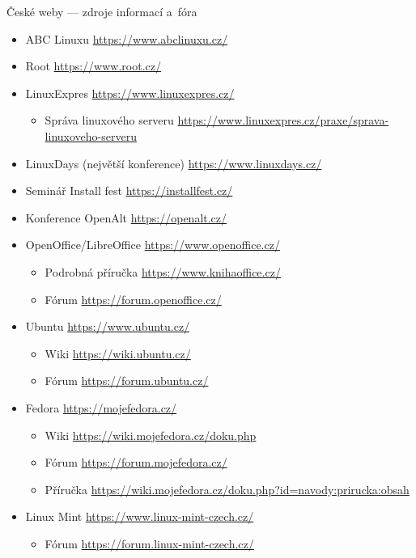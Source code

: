 \documentclass[compress, ucs, xelatex, 11pt, xcolor=svgnames, aspectratio=169,
	hyperref={
		bookmarks=true,
		unicode=true,
		colorlinks=true,
		pdftitle={Linux, command line and MetaCentrum},
		plainpages=false,
		pdfauthor={Vojtech Zeisek},
		pdfsubject={Course about use of Linux command line, writing shell scripts and using MetaCentrum of CESNET},
		pdfcreator={XeLaTeX},
		pdfkeywords={Linux, GNU, BASH, shell, command line, MetaCentrum},
		linkcolor=DarkRed, %
		anchorcolor=DarkBlue, %
		citecolor=Indigo, %
		filecolor=NavyBlue, %
		menucolor=DarkMagenta, %
		urlcolor=DarkBlue, %
		pdftex},
	url={hyphens, lowtilde} %
	]{beamer}
\begin{document}
\begin{frame}[allowframebreaks]{České weby --- zdroje informací a~fóra}
	\begin{itemize}
		\item ABC Linuxu \url{https://www.abclinuxu.cz/}
		\item Root \url{https://www.root.cz/}
		\item LinuxExpres \url{https://www.linuxexpres.cz/}
		\begin{itemize}
			\item Správa linuxového serveru \url{https://www.linuxexpres.cz/praxe/sprava-linuxoveho-serveru}
		\end{itemize}
		\item LinuxDays (největší konference) \url{https://www.linuxdays.cz/}
		\item Seminář Install fest \url{https://installfest.cz/}
		\item Konference OpenAlt \url{https://openalt.cz/}
		\item OpenOffice/LibreOffice \url{https://www.openoffice.cz/}
		\begin{itemize}
			\item Podrobná příručka \url{https://www.knihaoffice.cz/}
			\item Fórum \url{https://forum.openoffice.cz/}
		\end{itemize}
		\item Ubuntu \url{https://www.ubuntu.cz/}
		\begin{itemize}
			\item Wiki \url{https://wiki.ubuntu.cz/}
			\item Fórum \url{https://forum.ubuntu.cz/}
		\end{itemize}
		\item Fedora \url{https://mojefedora.cz/}
		\begin{itemize}
			\item Wiki \url{https://wiki.mojefedora.cz/doku.php}
			\item Fórum \url{https://forum.mojefedora.cz/}
			\item Příručka \url{https://wiki.mojefedora.cz/doku.php?id=navody:prirucka:obsah}
		\end{itemize}
		\item Linux Mint \url{https://www.linux-mint-czech.cz/}
		\begin{itemize}
			\item Fórum \url{https://forum.linux-mint-czech.cz/}
		\end{itemize}
	\end{itemize}
\end{frame}
\end{document}
